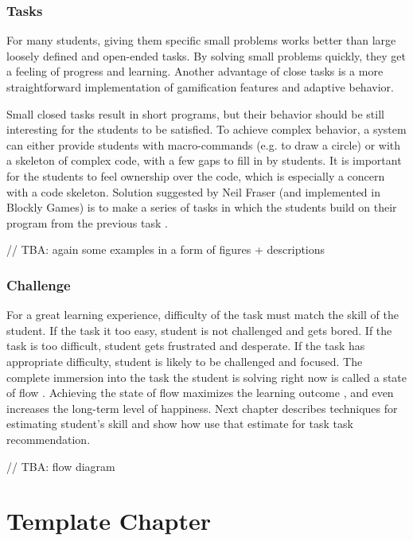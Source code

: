 \documentclass[
    digital,    %
    oneside,    %
    color,
    11pt,
    nocover,
    notable,
    nolof,
    nolot,
    final
]{fithesis3}
\begin{document}
\subsection{Tasks}
\label{sec:motivation.tasks}
For many students, giving them specific small problems works better
  than large loosely defined and open-ended tasks.
By solving small problems quickly,
  they get a feeling of progress and learning.
Another advantage of close tasks
  is a more straightforward implementation of gamification features and adaptive behavior.

Small closed tasks result in short programs,
  but their behavior should be still interesting for the students to be satisfied.
To achieve complex behavior,
  a system can either provide students with macro-commands (e.g. to draw a circle)
  or with a skeleton of complex code, with a few gaps to fill in by students.
It is important for the students to feel ownership over the code,
  which is especially a concern with a code skeleton.
Solution suggested by Neil Fraser (and implemented in Blockly Games)
  is to make a series of tasks in which the students
  build on their program from the previous task
  \cite{blockly-10-things}.

// TBA: again some examples in a form of figures + descriptions



\subsection{Challenge}
\label{sec:motivation.challenge}
For a great learning experience,
  difficulty of the task must match the skill of the student.
If the task it too easy,
  student is not challenged and gets bored.
If the task is too difficult,
  student gets frustrated and desperate.
If the task has appropriate difficulty,
  student is likely to be challenged and focused.
The complete immersion into the task the student is solving right now is called
  a state of flow \cite{flow}.
Achieving the state of flow maximizes the learning outcome \cite{adaptive-practice},
  and even increases the long-term level of happiness. %
Next chapter describes techniques for estimating student’s skill
  and show how use that estimate for task task recommendation.

// TBA: flow diagram


\chapter{Template Chapter}
\label{chap:template}
\end{document}
